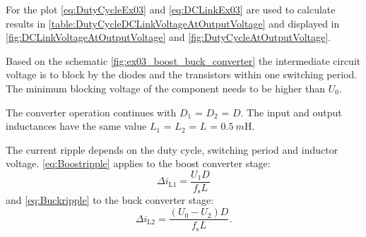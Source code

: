 
\begin{solutionblock}
    For the plot \eqref{eq:DutyCycleEx03} and \eqref{eq:DCLinkEx03} are used to calculate results in \autoref{table:DutyCycleDCLinkVoltageAtOutputVoltage} 
    and displayed in \autoref{fig:DCLinkVoltageAtOutputVoltage} and \autoref{fig:DutyCycleAtOutputVoltage}.

    
    
    

\end{solutionblock}


\begin{solutionblock}
    Based on the schematic \autoref{fig:ex03_boost_buck_converter} the intermediate circuit voltage is to block by the diodes and 
    the transistors within one switching period. The minimum blocking voltage of the component needs to be higher than $U_\mathrm{0}$.
\end{solutionblock}

\vspace{2em}\par
The converter operation continues with $D_\mathrm{1}$ = $D_\mathrm{2}$ = $D$. The input and output inductances 
have the same value $L_\mathrm{1}$ = $L_\mathrm{2}$ = $L$ = $\SI{0.5}{m\henry}$.


\begin{solutionblock}
    The current ripple depends on the duty cycle, switching period and inductor voltage.
    \eqref{eq:Boostripple} applies to the boost converter stage:
    \begin{equation}
        \Delta i_\mathrm{L1}=\frac{U_\mathrm{1}D}{f_\mathrm{s}L}
        \label{eq:Boostripple}
    \end{equation}
    and \eqref{eq:Buckripple} to the buck converter stage:
    \begin{equation}
        \Delta i_\mathrm{L2}=\frac{\left(U_\mathrm{0}-U_\mathrm{2}\right)D}{f_\mathrm{s}L}.
        \label{eq:Buckripple}
    \end{equation}
\end{solutionblock}


